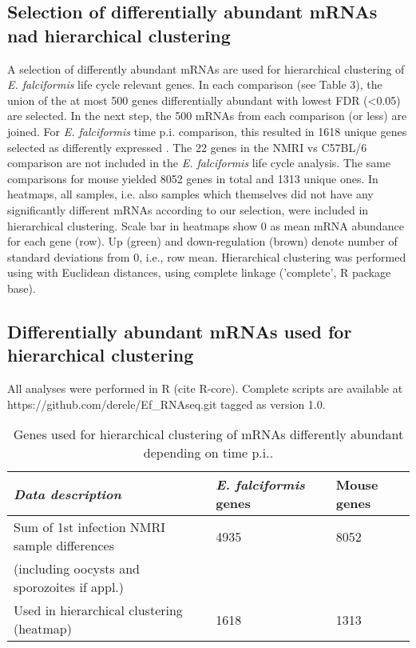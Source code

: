 \documentclass{bmcart}
\begin{document}
\subsection{Selection of differentially abundant mRNAs nad hierarchical clustering}
A selection of differently abundant mRNAs are used for hierarchical
clustering of \textit{E. falciformis} life cycle relevant genes. In
each comparison (see Table 3), the union of the at most 500 genes
differentially abundant with lowest FDR (<0.05) are selected. In the
next step, the 500 mRNAs from each comparison (or less) are
joined. For \textit{E. falciformis} time p.i. comparison, this
resulted in 1618 unique genes selected as differently expressed . The
22 genes in the NMRI vs C57BL/6 comparison are not included in the
\textit{E. falciformis} life cycle analysis. The same comparisons for
mouse yielded 8052 genes in total and 1313 unique ones. In heatmaps,
all samples, i.e. also samples which themselves did not have any
significantly different mRNAs according to our selection, were
included in hierarchical clustering. Scale bar in heatmaps show 0 as
mean mRNA abundance for each gene (row). Up (green) and
down-regulation (brown) denote number of standard deviations from 0,
i.e., row mean. Hierarchical clustering was performed using with
Euclidean distances, using complete linkage ('complete', R package
base).




\subsection{Differentially abundant mRNAs used for hierarchical clustering}
All analyses were performed in R (cite R-core). Complete scripts are
available at https://github.com/derele/Ef\_RNAseq.git tagged as version
1.0.

\setlength{\tabcolsep}{10pt}
\begin{table}[H]
\small
\begin{center}
\caption{Genes used for hierarchical clustering of mRNAs differently abundant depending on time p.i..}
\begin{tabular}{*3l}    \toprule
	\textit{Data description} & \emph{E. falciformis} genes & Mouse genes	\\ \midrule
	Sum of 1st infection NMRI sample differences	& 4935 & 8052 \\ 
	(including oocysts and sporozoites if appl.)	\\	
	Used in hierarchical clustering (heatmap)  	& 1618 & 1313 \\ 	\bottomrule	
\hline
\end{tabular}
\end{center}
\end{table}
\end{document}
